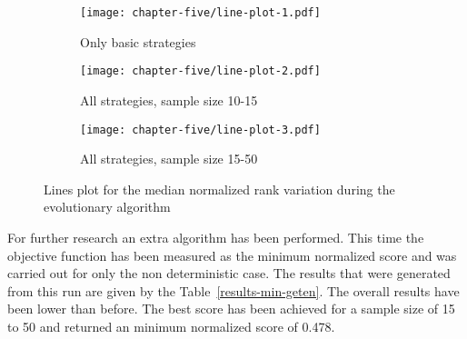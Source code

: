 \begin{figure}[H]
	\centering
	\begin{subfigure}[H]{0.45\textwidth}
		\centering
		\texttt{[image: chapter-five/line-plot-1.pdf]}
		\caption{Only basic strategies}
	\end{subfigure}
	\hfill
	\begin{subfigure}[H]{0.45\textwidth}
		\centering
		\texttt{[image: chapter-five/line-plot-2.pdf]}
		\caption{All strategies, sample size 10-15}
	\end{subfigure}
  \hfill
  \begin{subfigure}[H]{0.45\textwidth}
    \centering
    \texttt{[image: chapter-five/line-plot-3.pdf]}
    \caption{All strategies, sample size 15-50}
  \end{subfigure}
	\caption{Lines plot for the median normalized rank variation during the
          evolutionary algorithm}
	\label{fig:line-plots-median}
\end{figure}

For further research an extra algorithm has been performed. This time the
objective function has been measured as the minimum normalized score and was carried
out for only the non deterministic case. The results
that were generated from this run are given by the Table~\ref{results-min-geten}.
The overall results have been lower than before. The best score has been achieved for
a sample size of 15 to 50 and returned an minimum normalized score of 0.478.

